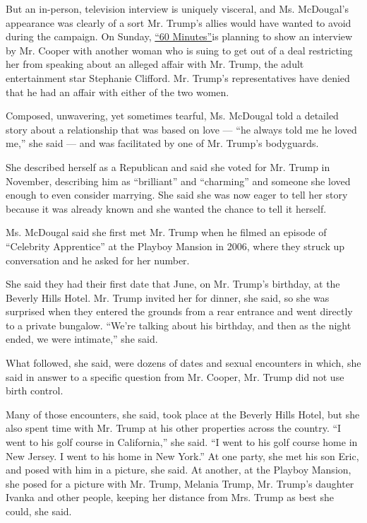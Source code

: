 But an in-person, television interview is uniquely visceral, and Ms.
McDougal's appearance was clearly of a sort Mr. Trump's allies would
have wanted to avoid during the campaign. On Sunday,
\href{https://www.cbsnews.com/news/stormy-daniels-60-minutes-donald-trump-interview-to-be-broadcast-sunday/}{``60
Minutes''}is planning to show an interview by Mr. Cooper with another
woman who is suing to get out of a deal restricting her from speaking
about an alleged affair with Mr. Trump, the adult entertainment star
Stephanie Clifford. Mr. Trump's representatives have denied that he had
an affair with either of the two women.

Composed, unwavering, yet sometimes tearful, Ms. McDougal told a
detailed story about a relationship that was based on love --- ``he
always told me he loved me,'' she said --- and was facilitated by one of
Mr. Trump's bodyguards.

She described herself as a Republican and said she voted for Mr. Trump
in November, describing him as ``brilliant'' and ``charming'' and
someone she loved enough to even consider marrying. She said she was now
eager to tell her story because it was already known and she wanted the
chance to tell it herself.

Ms. McDougal said she first met Mr. Trump when he filmed an episode of
``Celebrity Apprentice'' at the Playboy Mansion in 2006, where they
struck up conversation and he asked for her number.

She said they had their first date that June, on Mr. Trump's birthday,
at the Beverly Hills Hotel. Mr. Trump invited her for dinner, she said,
so she was surprised when they entered the grounds from a rear entrance
and went directly to a private bungalow. ``We're talking about his
birthday, and then as the night ended, we were intimate,'' she said.

What followed, she said, were dozens of dates and sexual encounters in
which, she said in answer to a specific question from Mr. Cooper, Mr.
Trump did not use birth control.

Many of those encounters, she said, took place at the Beverly Hills
Hotel, but she also spent time with Mr. Trump at his other properties
across the country. ``I went to his golf course in California,'' she
said. ``I went to his golf course home in New Jersey. I went to his home
in New York.'' At one party, she met his son Eric, and posed with him in
a picture, she said. At another, at the Playboy Mansion, she posed for a
picture with Mr. Trump, Melania Trump, Mr. Trump's daughter Ivanka and
other people, keeping her distance from Mrs. Trump as best she could,
she said.

